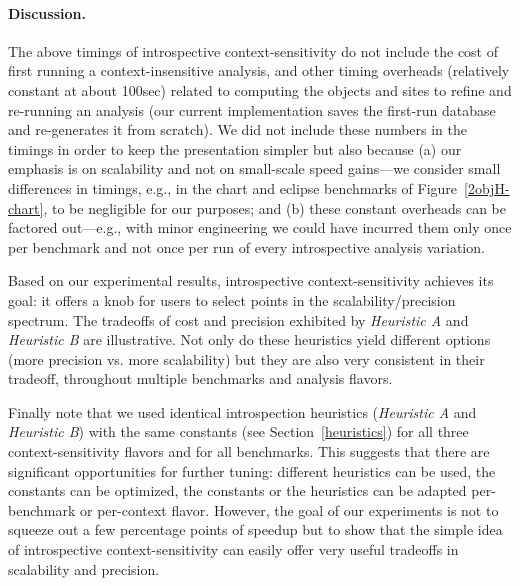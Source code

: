 \paragraph{Discussion.}

The above timings of introspective context-sensitivity do not include
the cost of first running a context-insensitive analysis, and other
timing overheads (relatively constant at about 100sec) related to
computing the objects and sites to refine and re-running an analysis
(our current implementation saves the first-run database and
re-generates it from scratch). We did not include these numbers in the
timings in order to keep the presentation simpler but also because (a)
our emphasis is on scalability and not on small-scale speed gains---we
consider small differences in timings, e.g., in the chart and eclipse
benchmarks of Figure~\ref{2objH-chart}, to be negligible for our
purposes; and (b) these constant overheads can be factored out---e.g.,
with minor engineering we could have incurred them only once per
benchmark and not once per run of every introspective analysis
variation.


Based on our experimental results, introspective context-sensitivity
achieves its goal: it offers a knob for users to select
points in the scalability/precision spectrum. The tradeoffs of cost
and precision exhibited by \emph{Heuristic A} and \emph{Heuristic B}
are illustrative. Not only do these heuristics yield different options
(more precision vs. more scalability) but they are also very
consistent in their tradeoff, throughout multiple benchmarks and
analysis flavors.

Finally note that we used identical introspection heuristics
(\emph{Heuristic A} and \emph{Heuristic B}) with the same constants
(see Section~\ref{heuristics}) for all three context-sensitivity
flavors and for all benchmarks. This suggests that there are
significant opportunities for further tuning: different heuristics can
be used, the constants can be optimized, the constants or the heuristics
can be adapted per-benchmark or per-context flavor. However, the goal
of our experiments is not to squeeze out a few percentage points of
speedup but to show that the simple idea of introspective
context-sensitivity can easily offer very useful tradeoffs in
scalability and precision.



